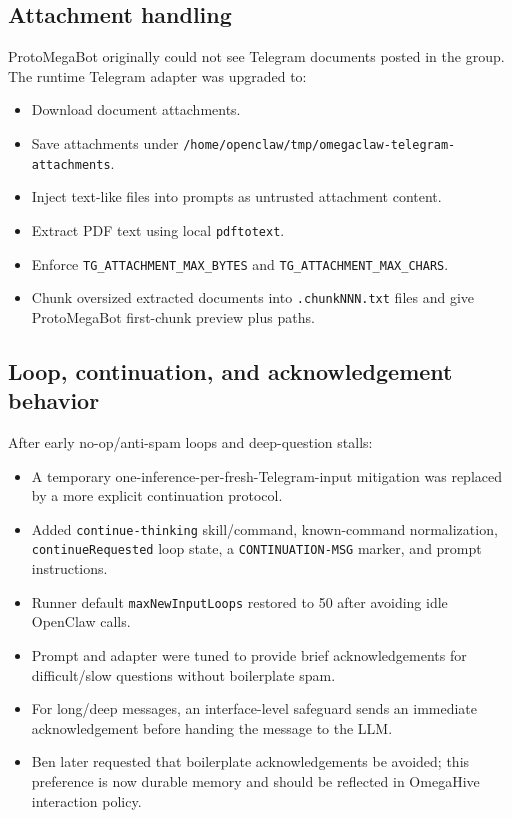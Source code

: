\documentclass[11pt]{article}
\begin{document}
\subsection{Attachment handling}

ProtoMegaBot originally could not see Telegram documents posted in the group.  The runtime Telegram adapter was upgraded to:
\begin{itemize}
  \item Download document attachments.
  \item Save attachments under \texttt{/home/openclaw/tmp/omegaclaw-telegram-attachments}.
  \item Inject text-like files into prompts as untrusted attachment content.
  \item Extract PDF text using local \texttt{pdftotext}.
  \item Enforce \texttt{TG\_ATTACHMENT\_MAX\_BYTES} and \texttt{TG\_ATTACHMENT\_MAX\_CHARS}.
  \item Chunk oversized extracted documents into \texttt{.chunkNNN.txt} files and give ProtoMegaBot first-chunk preview plus paths.
\end{itemize}

\subsection{Loop, continuation, and acknowledgement behavior}

After early no-op/anti-spam loops and deep-question stalls:
\begin{itemize}
  \item A temporary one-inference-per-fresh-Telegram-input mitigation was replaced by a more explicit continuation protocol.
  \item Added \texttt{continue-thinking} skill/command, known-command normalization, \texttt{continueRequested} loop state, a \texttt{CONTINUATION-MSG} marker, and prompt instructions.
  \item Runner default \texttt{maxNewInputLoops} restored to 50 after avoiding idle OpenClaw calls.
  \item Prompt and adapter were tuned to provide brief acknowledgements for difficult/slow questions without boilerplate spam.
  \item For long/deep messages, an interface-level safeguard sends an immediate acknowledgement before handing the message to the LLM.
  \item Ben later requested that boilerplate acknowledgements be avoided; this preference is now durable memory and should be reflected in OmegaHive interaction policy.
\end{itemize}
\end{document}
